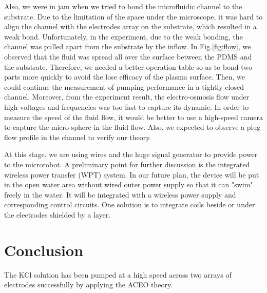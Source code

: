 \documentclass[journal,svgnames,twocolumn,x11names]{IEEEtran}
\begin{document}
Also, we were in jam when we tried to bond the microfluidic channel to the substrate. Due to the limitation of the space under the microscope, it was hard to align the channel with the electrodes array on the substrate, which resulted in a weak bond. Unfortunately, in the experiment, due to the weak bonding, the channel was pulled apart from the substrate by the inflow. In Fig.\ref{fig:flow}, we observed that the fluid was spread all over the surface between the PDMS and the substrate. Therefore, we needed a better operation table so as to bond two parts more quickly to avoid the lose efficacy of the plasma surface. Then, we could continue the measurement of pumping performance in a tightly closed channel. Moreover, from the experiment result, the electro-osmosis flow under high voltages and frequencies was too fast to capture its dynamic. In order to measure the speed of the fluid flow, it would be better to use a high-speed camera to capture the micro-sphere in the fluid flow. Also, we expected to observe a plug flow profile in the channel to verify our theory.

At this stage, we are using wires and the huge signal generator to provide power to the microrobot. A preliminary point for further discussion is the integrated wireless power transfer (WPT) system. In our future plan, the device will be put in the open water area without wired outer power supply so that it can "swim" freely in the water. It will be integrated with a wireless power supply and corresponding control circuits. One solution is to integrate coils beside or under the electrodes shielded by a layer.

\section{Conclusion}
The KCl solution has been pumped at a high speed across two arrays of electrodes successfully by applying the ACEO theory.
\end{document}
